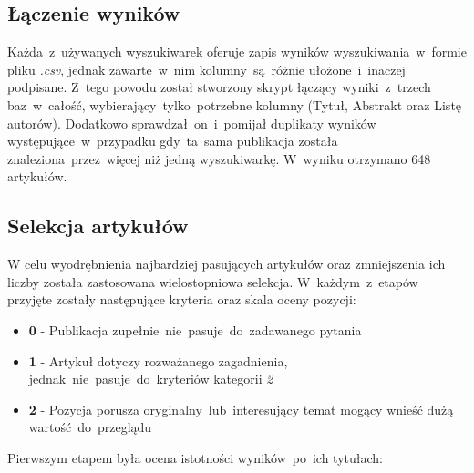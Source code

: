 \subsection{Łączenie wyników}
Każda~z~używanych wyszukiwarek oferuje zapis wyników wyszukiwania~w~formie pliku {\it .csv}, jednak zawarte~w~nim kolumny~są~różnie ułożone~i~inaczej podpisane. Z~tego powodu został stworzony skrypt łączący wyniki~z~trzech baz~w~całość, wybierający~tylko~potrzebne kolumny (Tytuł, Abstrakt oraz Listę autorów). Dodatkowo sprawdzał~on~i~pomijał duplikaty wyników występujące~w~przypadku gdy~ta~sama publikacja została znaleziona~przez~więcej niż jedną wyszukiwarkę. W~wyniku otrzymano 648 artykułów.

\subsection{Selekcja artykułów}
W celu wyodrębnienia najbardziej pasujących artykułów oraz zmniejszenia ich liczby została zastosowana wielostopniowa selekcja. W~każdym~z~etapów przyjęte zostały następujące kryteria oraz skala oceny pozycji:
\begin{itemize}
    \item {\bf 0} - Publikacja zupełnie~nie~pasuje~do~zadawanego pytania
    \item {\bf 1} - Artykuł dotyczy rozważanego zagadnienia, jednak~nie~pasuje~do~kryteriów kategorii {\it 2}
    \item {\bf 2} - Pozycja porusza oryginalny~lub~interesujący temat mogący wnieść dużą wartość~do~przeglądu
\end{itemize}
Pierwszym etapem była ocena istotności wyników~po~ich tytułach:

